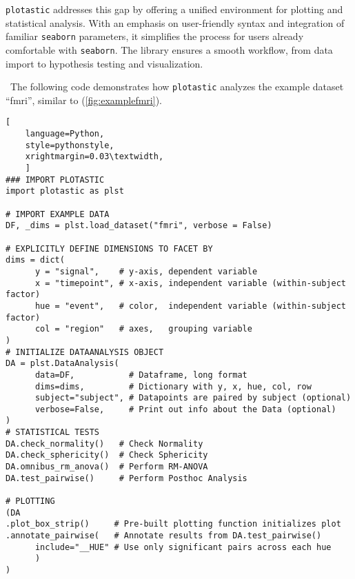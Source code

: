 \texttt{plotastic} addresses this gap by offering a unified environment for
plotting and statistical analysis. With an emphasis on user-friendly
syntax and integration of familiar \texttt{seaborn} parameters, it simplifies
the process for users already comfortable with \texttt{seaborn}. The library
ensures a smooth workflow, from data import to hypothesis testing and
visualization.



\newpage



\
The following code demonstrates how \texttt{plotastic} analyzes the
example dataset ``fmri'', similar to \citet{waskomSeabornStatisticalData2021}
(\autoref{fig:examplefmri}).

\begin{lstlisting}[
    language=Python, 
    style=pythonstyle,
    xrightmargin=0.03\textwidth,
    ]
### IMPORT PLOTASTIC
import plotastic as plst

# IMPORT EXAMPLE DATA
DF, _dims = plst.load_dataset("fmri", verbose = False)

# EXPLICITLY DEFINE DIMENSIONS TO FACET BY
dims = dict(
      y = "signal",    # y-axis, dependent variable
      x = "timepoint", # x-axis, independent variable (within-subject factor)
      hue = "event",   # color,  independent variable (within-subject factor)
      col = "region"   # axes,   grouping variable
)
# INITIALIZE DATAANALYSIS OBJECT
DA = plst.DataAnalysis(
      data=DF,           # Dataframe, long format
      dims=dims,         # Dictionary with y, x, hue, col, row 
      subject="subject", # Datapoints are paired by subject (optional)
      verbose=False,     # Print out info about the Data (optional)
)
# STATISTICAL TESTS
DA.check_normality()   # Check Normality
DA.check_sphericity()  # Check Sphericity
DA.omnibus_rm_anova()  # Perform RM-ANOVA
DA.test_pairwise()     # Perform Posthoc Analysis

# PLOTTING
(DA
.plot_box_strip()     # Pre-built plotting function initializes plot
.annotate_pairwise(   # Annotate results from DA.test_pairwise()
      include="__HUE" # Use only significant pairs across each hue
      ) 
)
\end{lstlisting}



\label{fig:examplefmri}



